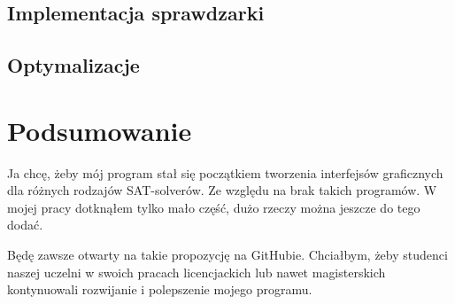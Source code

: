 \documentclass[a4paper,12pt,oneside]{book}
\theoremstyle{definition}
\begin{document}
\lipsum[2]

\lipsum[3]

\section{Implementacja sprawdzarki}

\lipsum[1]

\lipsum[2]

\lipsum[3]

\section{Optymalizacje}

\lipsum[1]

\lipsum[2]

\lipsum[3]

\lipsum[4]

\chapter*{Podsumowanie}

Ja chcę, żeby mój program stał się początkiem tworzenia interfejsów graficznych dla różnych rodzajów SAT-solverów. Ze względu na brak takich programów. W mojej pracy dotknąłem tylko mało część, dużo rzeczy można jeszcze do tego dodać.

Będę \cite{einstein} zawsze otwarty na takie propozycję na GitHubie. Chciałbym, żeby \cite{dirac} studenci naszej uczelni w \cite{dirac} swoich pracach licencjackich lub \cite{knuthwebsite} nawet magisterskich \cite{knuth-fa} kontynuowali rozwijanie i polepszenie mojego programu.

\printbibliography[title=Bibliografia]

\end{document}
